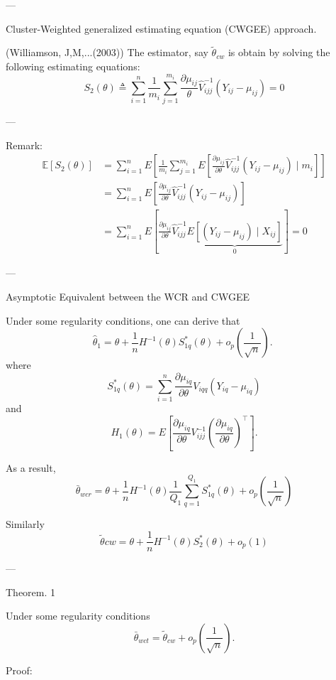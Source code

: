 \documentclass[UTF8,a4paper,10pt]{article}
\begin{document}
---

 Cluster-Weighted generalized estimating equation (CWGEE) approach. 

 (Williamson, J,M,...(2003))
The estimator, say $\widetilde{\theta}_{c w}$ is obtain by solving the following estimating equations:
$$
S_2(\theta) \triangleq \sum_{i=1}^n \frac{1}{m_i} \sum_{j=1}^{m_i} \frac{\partial \mu_{i j}}{\theta} \hat{V}_{i j j}^{-1}\left(Y_{i j}-\mu_{i j}\right)=0
$$

---

Remark:
$$
\begin{aligned}
\mathbb{E}\left[S_2(\theta)\right] & =\sum_{i=1}^n E\left[\frac{1}{m_i} \sum_{j=1}^{m_i} E\left[\frac{\partial \mu_{i j}}{\partial \theta} \hat{V}_{i j j}^{-1}\left(Y_{i j}-\mu_{i j}\right) \mid m_i\right]\right] \\
& =\sum_{i=1}^n E\left[\frac{\partial \mu_{i j}}{\partial \theta} \hat{V}_{i j j}^{-1}\left(Y_{i j}-\mu_{i j}\right)\right] \\
& =\sum_{i=1}^n E[\frac{\partial \mu_{i j}}{\partial \theta} \hat{V}_{i j j}^{-1} \underbrace{E\left[\left(Y_{i j}-\mu_{i j}\right) \mid X_{i j}\right]}_0]=0
\end{aligned}
$$

---

Asymptotic Equivalent between the WCR and CWGEE


Under some regularity conditions, one can derive that
$$
\hat{\theta}_1=\theta+\frac{1}{n} H^{-1}(\theta) S_{1 q}^*(\theta)+o_p\left(\frac{1}{\sqrt{n}}\right) \text {. }
$$
where 
$$S_{1 q}^*(\theta)=\sum_{i=1}^n \frac{\partial \mu_{i q}}{\partial \theta} V_{i q q}\left(Y_{i q}-\mu_{i q}\right)$$ and 
$$H_1(\theta)=E\left[\frac{\partial \mu_{i q}}{\partial \theta} V_{i j j}^{-1}\left(\frac{\partial \mu_{i q}}{\partial \theta}\right)^{\top}\right].$$

As a result,
$$
\bar{\theta}_{wcr}=\theta+\frac{1}{n} H^{-1}(\theta) \frac{1}{Q_1} \sum_{q=1}^{Q_1} S_{1 q}^*(\theta)+o_p\left(\frac{1}{\sqrt{n}}\right)
$$

Similarly
$$
\widetilde{\theta} c w=\theta+\frac{1}{n} H^{-1}(\theta) S_2^*(\theta)+o_p(1)
$$

---

Theorem. 1

Under some regularity conditions
$$
\bar{\theta}_{w c t}=\widetilde{\theta}_{c w}+o_p\left(\frac{1}{\sqrt{n}}\right).
$$

Proof: 
\end{document}
